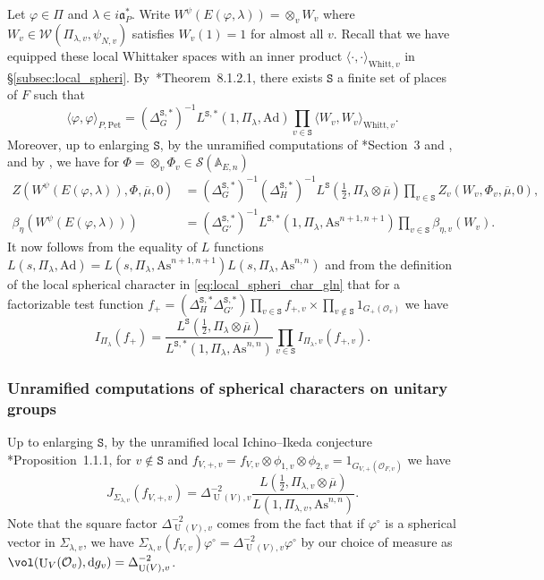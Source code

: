 \documentclass[letterpaper,11pt]{amsart}
\newcommand{\fa}{\mathfrak{a}}
\newcommand{\bA}{\mathbb{A}}
\newcommand{\cO}{\mathcal{O}}
\newcommand{\cS}{\mathcal{S}}
\newcommand{\cW}{\mathcal{W}}
\newcommand{\rd}{\mathrm{d}}
\newcommand{\tS}{\mathtt{S}}
\newcommand{\<}{\negthickspace}
\DeclareMathOperator{\U}{U}
\theoremstyle{definition}
\theoremstyle{plain}
\theoremstyle{remark}
\numberwithin{equation}{section}
\begin{document}
Let $\varphi \in \Pi$ and $\lambda \in i \fa_P^*$. Write $W^\psi(E(\varphi,\lambda))=\otimes_v W_v$ where $W_v \in \cW(\Pi_{\lambda,v},\psi_{N,v})$ satisfies $W_v(1)=1$ for almost all $v$. Recall that we have equipped these local Whittaker spaces with an inner product $\langle \cdot,\cdot \rangle_{\mathrm{Whitt},v}$ in \S\ref{subsec:local_spheri}. By~\cite{BPCZ}*{Theorem~8.1.2.1}, there exists $\tS$ a finite set of places of $F$ such that
\begin{equation*}
    \langle \varphi,\varphi \rangle_{P,\mathrm{Pet}}=(\Delta_{G}^{\tS,*})^{-1}L^{\tS,*}(1,\Pi_{\lambda},\mathrm{Ad}) \prod_{v \in \tS} \langle W_v,W_v \rangle_{\mathrm{Whitt},v}.
\end{equation*}
Moreover, up to enlarging $\tS$, by the unramified computations of \cite{Zhang2}*{Section~3} and \cite{JS}, and by \cite{Fli}, we have for $\Phi=\otimes_v \Phi_v \in \cS(\bA_{E,n})$ 
\begin{align*}
     Z(W^\psi(E(\varphi,\lambda)), \Phi, \overline{\mu}, 0)&=(\Delta_{G}^{\tS,*})^{-1}(\Delta_H^{\tS,*})^{-1} L^{\tS}(\frac{1}{2},\Pi_\lambda \otimes \overline{\mu})\prod_{v \in \tS} Z_v(W_v,\Phi_v,\overline{\mu},0), \\
     \beta_\eta(W^\psi(E(\varphi,\lambda)))&=(\Delta_{G'}^{\tS,*})^{-1}L^{\tS,*}(1,\Pi_{\lambda},\mathrm{As}^{n+1,n+1}) \prod_{v \in \tS} \beta_{\eta,v}(W_v).
\end{align*}
It now follows from the equality of $L$ functions $L(s,\Pi_{\lambda},\mathrm{Ad})=L(s,\Pi_{\lambda},\mathrm{As}^{n+1,n+1})L(s,\Pi_{\lambda},\mathrm{As}^{n,n})$ and from the definition of the local spherical character in \eqref{eq:local_spheri_char_gln} that for a factorizable test function $f_+= (\Delta_H^{\tS,*} \Delta_{G'}^{\tS,*}) \prod_{v \in \tS}f_{+,v} \times \prod_{v \notin \tS} 1_{G_+(\cO_v)}$ we have
\begin{equation}
\label{eq:global_facto}
    I_{\Pi_\lambda}(f_+)=\frac{L^{\tS}(\frac{1}{2},\Pi_\lambda \otimes \overline{\mu})}{L^{\tS,*}(1,\Pi_\lambda,\mathrm{As}^{n,n})} \prod_{v \in \tS} I_{\Pi_\lambda,v}(f_{+,v}).
\end{equation}


\subsubsection{Unramified computations of spherical characters on unitary groups}

Up to enlarging $\tS$, by the unramified local Ichino--Ikeda conjecture \cite{Xue2}*{Proposition~1.1.1}, for $v \notin \tS$ and $f_{V,+,v}=f_{V,v} \otimes \phi_{1,v} \otimes \phi_{2,v}=1_{G_{V,+}(\cO_{F,v})}$ we have 
\begin{equation}
\label{eq:unram_J}
    J_{\Sigma_{\lambda,v}}(f_{V,+,v})=\Delta_{\U(V),v}^{-2} \frac{L(\frac{1}{2},\Pi_{\lambda,v} \otimes \overline{\mu})}{L(1,\Pi_{\lambda,v},\mathrm{As}^{n,n})}.
\end{equation}
Note that the square factor $\Delta_{\U(V),v}^{-2}$ comes from the fact that if $\varphi^\circ$ is a spherical vector in $\Sigma_{\lambda,v}$, we have $\Sigma_{\lambda,v}(f_{V,v}) \varphi^\circ= \Delta_{\U(V),v}^{-2} \varphi^\circ$ by our choice of measure as $\vol(\U_V(\cO_v),\rd g_v)=\Delta_{\U(V),v}^{-2}$.
\end{document}
